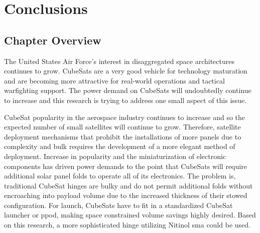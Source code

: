 \chapter{Conclusions}
\label{chap:5}





\section{Chapter Overview}

The United States Air Force's interest in disaggregated space architectures continues to grow. CubeSats are a very good vehicle for technology maturation and are becoming more attractive for real-world operations and tactical warfighting support. The power demand on CubeSats will undoubtedly continue to increase and this research is trying to address one small aspect of this issue.

CubeSat popularity in the aerospace industry continues to increase and so the expected number of small satellites will continue to grow. Therefore, satellite deployment mechanisms that prohibit the installations of more panels due to complexity and bulk requires the development of a more elegant method of deployment. Increase in popularity and the miniaturization of electronic components has driven power demands to the point that CubeSats will require additional solar panel folds to operate all of its electronics. The problem is, traditional CubeSat hinges are bulky and do not permit additional folds without encroaching into payload volume due to the increased thickness of their stowed configuration. For launch, CubeSats have to fit in a standardized CubeSat launcher or \gls{ppod}, making space constrained volume savings highly desired. Based on this research, a more sophisticated hinge utilizing Nitinol \gls{sma} could be used.  

